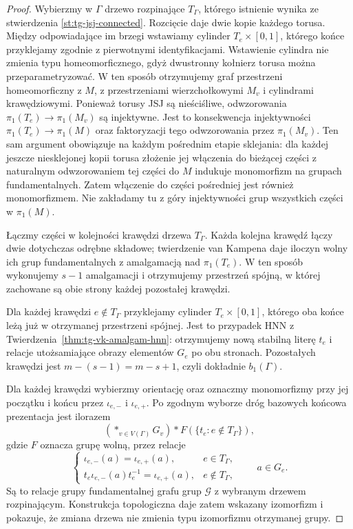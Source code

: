 \begin{proof}
Wybierzmy w $\Gamma$ drzewo rozpinające
$T_\Gamma$, którego istnienie wynika
ze stwierdzenia \ref{st:tg-jsj-connected}.
Rozcięcie daje dwie kopie każdego torusa.
Między odpowiadające im brzegi wstawiamy cylinder
$T_e\times[0,1]$, którego końce przyklejamy
zgodnie z pierwotnymi identyfikacjami.
Wstawienie cylindra nie zmienia typu
homeomorficznego, gdyż dwustronny kołnierz
torusa można przeparametryzować. W ten sposób
otrzymujemy graf przestrzeni homeomorficzny z $M$,
z przestrzeniami wierzchołkowymi $M_v$
i cylindrami krawędziowymi.
Ponieważ torusy JSJ są nieściśliwe,
odwzorowania $\pi_1(T_e)\to\pi_1(M_v)$
są injektywne. Jest to konsekwencja
injektywności $\pi_1(T_e)\to\pi_1(M)$
oraz faktoryzacji tego odwzorowania
przez $\pi_1(M_v)$. Ten sam argument obowiązuje
na każdym pośrednim etapie sklejania: dla każdej
jeszcze niesklejonej kopii torusa złożenie jej
włączenia do bieżącej części z naturalnym
odwzorowaniem tej części do $M$ indukuje
monomorfizm na grupach fundamentalnych. Zatem
włączenie do części pośredniej jest również
monomorfizmem. Nie zakładamy tu z góry
injektywności grup wszystkich części w $\pi_1(M)$.

Łączmy części w kolejności
krawędzi drzewa $T_\Gamma$.
Każda kolejna krawędź łączy
dwie dotychczas odrębne składowe;
twierdzenie van Kampena daje
iloczyn wolny ich grup fundamentalnych
z amalgamacją nad $\pi_1(T_e)$.
W ten sposób wykonujemy $s-1$
amalgamacji i otrzymujemy przestrzeń
spójną, w której zachowane są obie
strony każdej pozostałej krawędzi.

Dla każdej krawędzi $e\notin T_\Gamma$
przyklejamy cylinder
$T_e\times[0,1]$, którego oba
końce leżą już w otrzymanej
przestrzeni spójnej. Jest to
przypadek HNN z
Twierdzenia~\ref{thm:tg-vk-amalgam-hnn}:
otrzymujemy nową stabilną literę
$t_e$ i relacje utożsamiające
obrazy elementów $G_e$ po obu
stronach. Pozostałych krawędzi jest
$m-(s-1)=m-s+1$, czyli dokładnie
$b_1(\Gamma)$.

Dla każdej krawędzi wybierzmy orientację oraz
oznaczmy monomorfizmy przy jej początku i końcu
przez $\iota_{e,-}$ i $\iota_{e,+}$.
Po zgodnym wyborze dróg bazowych końcowa
prezentacja jest ilorazem
\[
\left(*_{v\in V(\Gamma)}G_v\right)
 * F(\{t_e:e\notin T_\Gamma\}),
\]
gdzie $F$ oznacza grupę wolną, przez relacje
\[
\begin{cases}
\iota_{e,-}(a)=\iota_{e,+}(a),&e\in T_\Gamma,\\
t_e\iota_{e,-}(a)t_e^{-1}=\iota_{e,+}(a),
&e\notin T_\Gamma,
\end{cases}
\qquad a\in G_e.
\]
Są to relacje grupy fundamentalnej grafu grup
$\mathcal G$ z wybranym drzewem rozpinającym.
Konstrukcja topologiczna daje zatem wskazany
izomorfizm i pokazuje, że zmiana drzewa nie
zmienia typu izomorfizmu otrzymanej grupy.
\end{proof}

